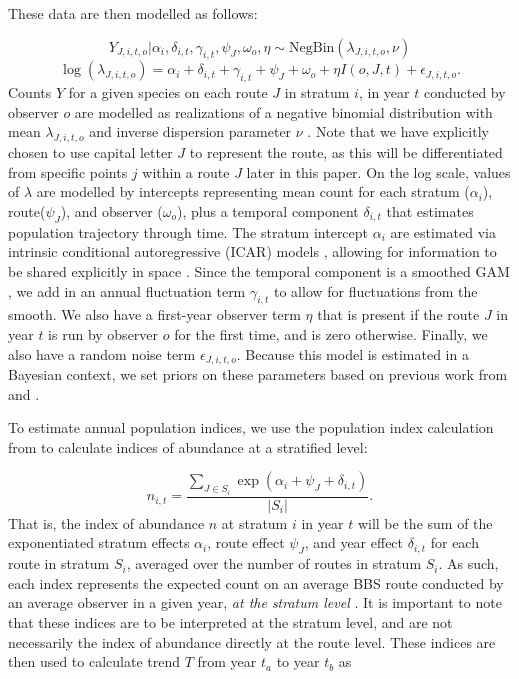 \par These data are then modelled as follows:

\begin{equation*}
	Y_{J,i,t,o} | \alpha_i, \delta_{i,t}, \gamma_{i,t}, \psi_J, \omega_o, \eta \sim \text{NegBin}(\lambda_{J,i,t,o}, \nu)
\end{equation*}
\begin{equation}\label{bbs}
\log(\lambda_{J,i,t,o}) = \alpha_i + \delta_{i,t} + \gamma_{i,t} + \psi_J + \omega_o + \eta I(o,J,t) + \epsilon_{J,i,t,o}.
\end{equation}
Counts $Y$ for a given species on each route $J$ in stratum $i$, in year $t$ conducted by observer $o$ are modelled as realizations of a negative binomial distribution with mean $\lambda_{J,i,t,o}$ and inverse dispersion parameter $\nu$ \citet{smith_spatially_2023}. 
Note that we have explicitly chosen to use capital letter $J$ to represent the route, as this will be differentiated from specific points $j$ within a route $J$ later in this paper.
On the log scale, values of $\lambda$ are modelled by intercepts representing mean count for each stratum ($\alpha_i$), route($\psi_J$), and observer ($\omega_o$), plus a temporal component $\delta_{i,t}$ that estimates population trajectory through time. 
The stratum intercept $\alpha_i$ are estimated via intrinsic conditional autoregressive (ICAR) models \citep{besag_bayesian_1991}, allowing for information to be shared explicitly in space \citep{smith_spatially_2023}.
Since the temporal component is a smoothed GAM \citep{smith_north_2021}, we add in an annual fluctuation term $\gamma_{i,t}$ to allow for fluctuations from the smooth. 
We also have a first-year observer term $\eta$ that is present if the route $J$ in year $t$ is run by observer $o$ for the first time, and is zero otherwise. 
Finally, we also have a random noise term $\epsilon_{J,i,t,o}$.
Because this model is estimated in a Bayesian context, we set priors on these parameters based on previous work from \citet{smith_north_2021} and \citet{smith_spatially_2023}.

\par To estimate annual population indices, we use the population index calculation from \citet{smith_north_2021} to calculate indices of abundance at a stratified level:

\begin{equation}\label{index}
	n_{i,t} = \dfrac{\sum_{J\in S_i}\exp(\alpha_i + \psi_J + \delta_{i,t})}{|S_i|}.
\end{equation}
That is, the index of abundance $n$ at stratum $i$ in year $t$ will be the sum of the exponentiated stratum effects $\alpha_i$, route effect $\psi_J$, and year effect $\delta_{i,t}$ for each route in stratum $S_i$, averaged over the number of routes in stratum $S_i$.
As such, each index represents the expected count on an average BBS route conducted by an average observer in a given year, \textit{at the stratum level} \citep{smith_north_2021}.
It is important to note that these indices are to be interpreted at the stratum level, and are not necessarily the index of abundance directly at the route level.
These indices are then used to calculate trend $T$ from year $t_a$ to year $t_b$ as

